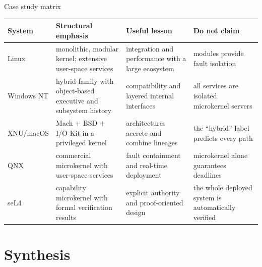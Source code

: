 \documentclass[aspectratio=169,11pt]{beamer}
\begin{document}
\begin{frame}{Case study matrix}
  \small
  \begin{tabularx}{\textwidth}{@{}lXXX@{}}
    \toprule
    \textbf{System} & \textbf{Structural emphasis} & \textbf{Useful lesson} & \textbf{Do not claim} \\
    \midrule
    Linux & monolithic, modular kernel; extensive user-space services & integration and performance with a large ecosystem & modules provide fault isolation \\
    Windows NT & hybrid family with object-based executive and subsystem history & compatibility and layered internal interfaces & all services are isolated microkernel servers \\
    XNU/macOS & Mach + BSD + I/O Kit in a privileged kernel & architectures accrete and combine lineages & the ``hybrid'' label predicts every path \\
    QNX & commercial microkernel with user-space services & fault containment and real-time deployment & microkernel alone guarantees deadlines \\
    seL4 & capability microkernel with formal verification results & explicit authority and proof-oriented design & the whole deployed system is automatically verified \\
    \bottomrule
  \end{tabularx}
\end{frame}

\section{Synthesis}
\end{document}
